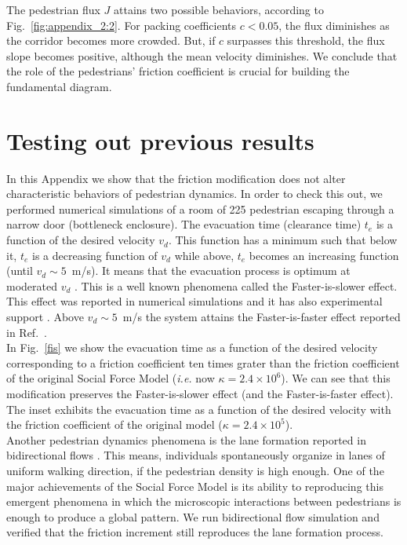 The pedestrian flux $J$ attains two possible behaviors, according to 
Fig.~\ref{fig:appendix_2:2}. For packing coefficients $c<0.05$, the flux 
diminishes as the corridor becomes more crowded. But, if $c$ surpasses this 
threshold, the flux slope becomes positive, although the mean velocity 
diminishes. We conclude that the role of the pedestrians' friction coefficient is crucial 
for building the fundamental diagram.   


\section{\label{appendix_3} Testing out previous results}


In this Appendix we show that the friction modification does not alter characteristic behaviors of pedestrian dynamics. In order to check this out, we performed numerical simulations of a room of 225 pedestrian escaping through a narrow door (bottleneck enclosure). The evacuation time (clearance time) $t_e$ is a function of the desired velocity $v_d$. This function has a minimum such that below it, $t_e$ is a decreasing function of $v_d$ while above, $t_e$ becomes an increasing function (until $v_d \sim 5$~m/s). It means that the evacuation process is optimum at moderated $v_d$ . This is a well known phenomena called the Faster-is-slower effect. This effect was reported in numerical simulations \cite{Helbing1,Dorso5} and it has also experimental support \cite{parisi1}.
Above $v_d \sim 5$~m/s the system attains the Faster-is-faster effect reported in Ref.~\cite{sticco}. \\

In Fig.~\ref{fis} we show the evacuation time as a function of the desired velocity corresponding to a friction coefficient ten times grater than the friction coefficient of the original Social Force Model (\textit{i.e.} now $\kappa=2.4\times 10^{6}$). We can see that this modification preserves the Faster-is-slower effect (and the Faster-is-faster effect). The inset exhibits the evacuation time as a function of the desired velocity with the friction coefficient of the original model ($\kappa=2.4\times 10^{5}$).\\

Another pedestrian dynamics phenomena is the lane formation reported in bidirectional flows \cite{feliciani1,helbing5,guo1,qiao1}. This means, individuals spontaneously organize in lanes of uniform walking direction, if the pedestrian density is high enough. One of the major achievements of the Social Force Model is its ability to reproducing this emergent phenomena in which the microscopic interactions between pedestrians is enough to produce a global pattern. We run bidirectional flow simulation and verified that the friction increment still reproduces the lane formation process.\\  

